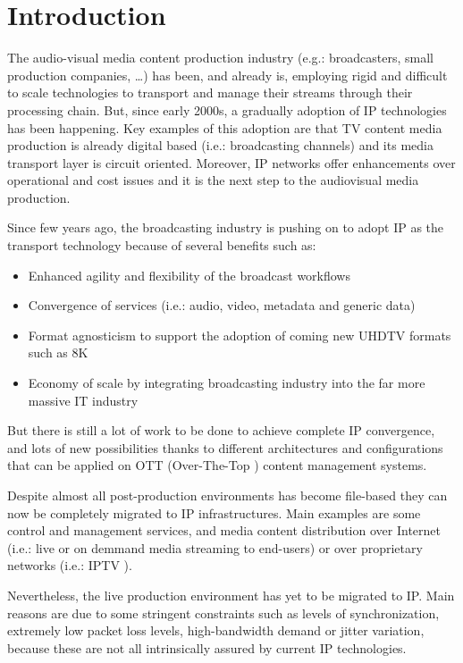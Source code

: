 \cleardoublepage
{}
\chapter*{Introduction}
 
The audio-visual media content production industry (e.g.: broadcasters, small production companies, \ldots) has been, and already is, employing rigid and difficult to scale technologies to transport and manage their streams through their processing chain. But, since early 2000s, a gradually adoption of IP technologies has been happening. Key examples of this adoption are that TV content media production is already digital based (i.e.: broadcasting channels) and its media transport layer is circuit oriented. Moreover, IP networks offer enhancements over operational and cost issues and it is the next step to the audiovisual media production.

Since few years ago, the broadcasting industry is pushing on to adopt IP as the transport technology because of several benefits such as:

\begin{itemize}
  \item Enhanced agility and flexibility of the broadcast workflows
  \item Convergence of services (i.e.: audio, video, metadata and generic data)
  \item Format agnosticism to support the adoption of coming new UHDTV formats such as 8K 
  \item Economy of scale by integrating broadcasting industry into the far more massive IT industry
\end{itemize}

But there is still a lot of work to be done to achieve complete IP convergence, and lots of new possibilities thanks to different architectures and configurations that can be applied on OTT (Over-The-Top \cite{ottVSiptv}) content management systems. 

Despite almost all post-production environments has become file-based they can now be completely migrated to IP infrastructures. Main examples are some control and management services, and media content distribution over Internet (i.e.: live or on demmand media streaming to end-users) or over proprietary networks (i.e.: IPTV \cite{ottVSiptv}).

Nevertheless, the live production environment has yet to be migrated to IP. Main reasons are due to some stringent constraints such as levels of synchronization, extremely low packet loss levels, high-bandwidth demand or jitter variation, because these are not all intrinsically assured by current IP technologies.

